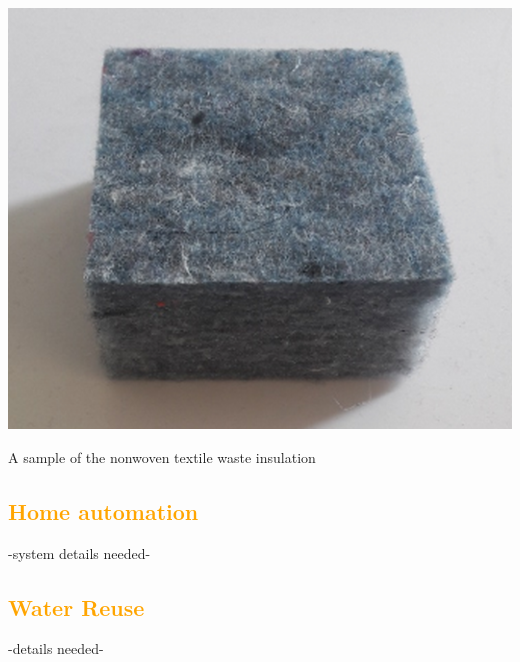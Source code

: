 \documentclass[justified]{tufte-book}
\begin{document}
\begin{marginfigure}
    \includegraphics[width=\textwidth]{insul}
    \caption{A sample of the nonwoven textile waste insulation}
\end{marginfigure}

	\textcolor{orange}{\chapter{Home automation}}
	-system details needed-
	\textcolor{orange}{\chapter{Water Reuse}}
	-details needed-
	
	
	
	
\end{document}

